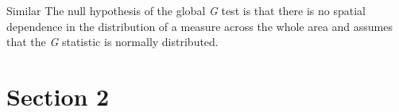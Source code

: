 \documentclass[11pt,a4paper,twoside]{article}\usepackage[]{graphicx}\usepackage[]{color}
\begin{document}
Similar
The null hypothesis of the global \textit{G} test is that there is no spatial dependence in the distribution of a measure across the whole area and assumes that the \textit{G} statistic is normally distributed. 


\section*{Section 2}



\end{document}

